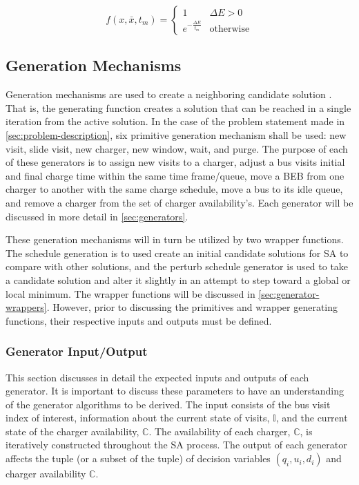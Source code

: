 \documentclass[11pt,a4paper,final]{article}
\newcommand{\I}{\mathbb{I}}                 %
\newcommand{\C}{\mathbb{C}}                 %
\begin{document}
\begin{equation}
\label{eq:candaccept}
f(x,\bar{x},t_m) =
\begin{cases}
  1                   & \Delta E > 0 \\
  e^{- \frac{\Delta E}{t_m}} & \text{otherwise}
\end{cases}
\end{equation}

\subsection{Generation Mechanisms}
\label{sec:generation-mechanisms}
Generation mechanisms are used to create a neighboring candidate solution \cite{gendreau-2018-handb-metah}. That is,
the generating function creates a solution that can be reached in a single iteration from the active solution. In the
case of the problem statement made in \ref{sec:problem-description}, six primitive generation mechanism shall be used: new
visit, slide visit, new charger, new window, wait, and purge. The purpose of each of these generators is to assign new
visits to a charger, adjust a bus visits initial and final charge time within the same time frame/queue, move a BEB from
one charger to another with the same charge schedule, move a bus to its idle queue, and remove a charger from the set
of charger availability's. Each generator will be discussed in more detail in \ref{sec:generators}.

These generation mechanisms will in turn be utilized by two wrapper functions. The schedule generation is to used create
an initial candidate solutions for SA to compare with other solutions, and the perturb schedule generator is used to
take a candidate solution and alter it slightly in an attempt to step toward a global or local minimum. The wrapper
functions will be discussed in \ref{sec:generator-wrappers}. However, prior to discussing the primitives and wrapper
generating functions, their respective inputs and outputs must be defined.

\subsubsection{Generator Input/Output}
\label{sec:generator-input-output}
This section discusses in detail the expected inputs and outputs of each generator. It is important to discuss these
parameters to have an understanding of the generator algorithms to be derived. The input consists of the bus visit index
of interest, information about the current state of visits, \(\I\), and the current state of the charger availability,
\(\C\). The availability of each charger, \(\C\), is iteratively constructed throughout the SA process. The output of each
generator affects the tuple (or a subset of the tuple) of decision variables \((q_i, u_i, d_i)\) and charger availability
\(\C\).
\end{document}
